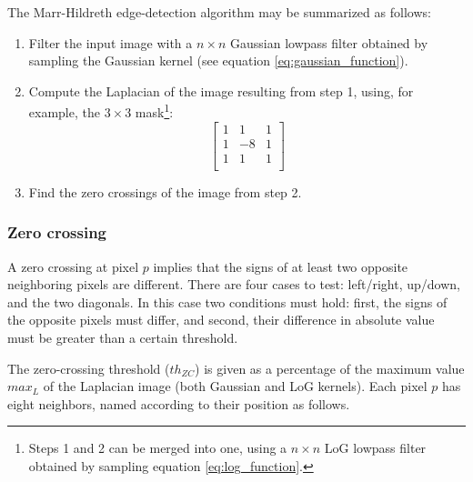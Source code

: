 \documentclass{ipol}
\numberwithin{equation}{section}
\numberwithin{table}{section}
\begin{document}
The Marr-Hildreth edge-detection algorithm may be summarized as follows:
\begin{enumerate}
	\item Filter the input image with a $n \times n$ Gaussian lowpass filter obtained by sampling the Gaussian kernel (see equation \ref{eq:gaussian_function}). %
	\item Compute the Laplacian of the image resulting from step 1, using, for example, the $3\times3$ mask\footnote{Steps 1 and 2 can be merged into one, using a $n\times n$ LoG lowpass filter obtained by sampling equation \ref{eq:log_function}.}:
	\begin{equation*}
		\begin{bmatrix}
			1 &  1 & 1 \\
			1 & -8 & 1 \\
			1 &  1 & 1 \\
		\end{bmatrix}
	\end{equation*}
	\item Find the zero crossings of the image from step 2.
\end{enumerate}



\subsubsection{Zero crossing}


A zero crossing at pixel $p$ implies that the signs of at least two opposite neighboring pixels are 
different. There are four cases to test: left/right, up/down, and the two diagonals. In this case 
two conditions must hold: first, the signs of the opposite pixels must differ, and second, their 
difference in absolute value must be greater than a certain threshold. 

The zero-crossing threshold ($th_{ZC}$) is given as a percentage of the maximum value $max_L$ of the Laplacian 
image (both Gaussian and LoG kernels). Each pixel $p$ has eight neighbors, named according to their position 
as follows.
\end{document}
